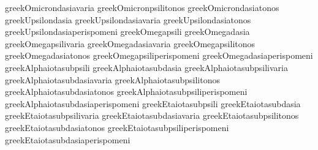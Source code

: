  greekOmicrondasiavaria            {\greekdasiavaria \greekOmicron}
 greekOmicronpsilitonos            {\greekpsilitonos \greekOmicron}
 greekOmicrondasiatonos            {\greekdasiatonos \greekOmicron}
 greekUpsilondasia                 {\dasia \greekUpsilon}
 greekUpsilondasiavaria            {\greekdasiavaria \greekUpsilon}
 greekUpsilondasiatonos            {\greekdasiatonos \greekUpsilon}
 greekUpsilondasiaperispomeni      {\greekdasiaperispomeni \greekUpsilon}
 greekOmegapsili                   {\psili \greekOmega}
 greekOmegadasia                   {\dasia \greekOmega}
 greekOmegapsilivaria              {\greekpsilivaria \greekOmega}
 greekOmegadasiavaria              {\greekdasiavaria \greekOmega}
 greekOmegapsilitonos              {\greekpsilitonos \greekOmega}
 greekOmegadasiatonos              {\greekdasiatonos \greekOmega}
 greekOmegapsiliperispomeni        {\greekpsiliperispomeni \greekOmega}
 greekOmegadasiaperispomeni        {\greekdasiaperispomeni \greekOmega}
 greekAlphaiotasubpsili            {\psili \greekAlpha \greekiota}
 greekAlphaiotasubdasia            {\dasia \greekAlpha \greekiota}
 greekAlphaiotasubpsilivaria       {\greekpsilivaria \greekAlpha \greekiota}
 greekAlphaiotasubdasiavaria       {\greeldasiavaria \greekAlpha \greekiota}
 greekAlphaiotasubpsilitonos       {\greekpsilitonos \greekAlpha \greekiota}
 greekAlphaiotasubdasiatonos       {\greekdasiatonos \greekAlpha \greekiota}
 greekAlphaiotasubpsiliperispomeni {\greekpsiliperispomeni \greekAlpha \greekiota}
 greekAlphaiotasubdasiaperispomeni {\greekdasiaperispomeni \greekAlpha \greekiota}
 greekEtaiotasubpsili              {\psili \greekEta \greekiota}
 greekEtaiotasubdasia              {\dasia \greekEta \greekiota}
 greekEtaiotasubpsilivaria         {\greekpsilivaria \greekEta \greekiota}
 greekEtaiotasubdasiavaria         {\greekdasiavaria \greekEta \greekiota}
 greekEtaiotasubpsilitonos         {\greekpsilitonos \greekEta \greekiota}
 greekEtaiotasubdasiatonos         {\greekdasiatonos \greekEta \greekiota}
 greekEtaiotasubpsiliperispomeni   {\greekpsiliperispomeni \greekEta \greekiota}
 greekEtaiotasubdasiaperispomeni   {\greekdasiaperispomeni \greekEta \greekiota}
